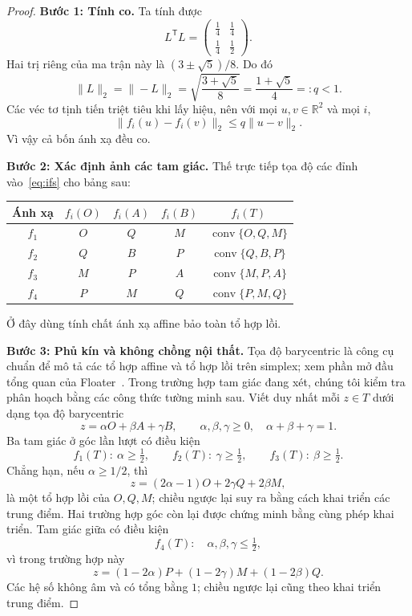 \documentclass[12pt,a4paper]{article}
\begin{document}
\begin{proof}
\textbf{Bước 1: Tính co.}
Ta tính được
\[
L^{\mathsf T}L=\begin{pmatrix}\tfrac14&\tfrac14\\\tfrac14&\tfrac12\end{pmatrix}.
\]
Hai trị riêng của ma trận này là $(3\pm\sqrt5)/8$. Do đó
\[
\|L\|_2=\|-L\|_2
=\sqrt{\frac{3+\sqrt5}{8}}
=\frac{1+\sqrt5}{4}=:q<1.
\]
Các véc tơ tịnh tiến triệt tiêu khi lấy hiệu, nên với mọi $u,v\in\mathbb R^2$ và mọi $i$,
\[
\|f_i(u)-f_i(v)\|_2\leq q\|u-v\|_2.
\]
Vì vậy cả bốn ánh xạ đều co.

\textbf{Bước 2: Xác định ảnh các tam giác.}
Thế trực tiếp tọa độ các đỉnh vào~\eqref{eq:ifs} cho bảng sau:
\begin{center}
\begin{tabular}{ccccc}
\toprule
Ánh xạ & $f_i(O)$ & $f_i(A)$ & $f_i(B)$ & $f_i(T)$\\
\midrule
$f_1$ & $O$ & $Q$ & $M$ & $\operatorname{conv}\{O,Q,M\}$\\
$f_2$ & $Q$ & $B$ & $P$ & $\operatorname{conv}\{Q,B,P\}$\\
$f_3$ & $M$ & $P$ & $A$ & $\operatorname{conv}\{M,P,A\}$\\
$f_4$ & $P$ & $M$ & $Q$ & $\operatorname{conv}\{P,M,Q\}$\\
\bottomrule
\end{tabular}
\end{center}
Ở đây dùng tính chất ánh xạ affine bảo toàn tổ hợp lồi.

\textbf{Bước 3: Phủ kín và không chồng nội thất.}
Tọa độ barycentric là công cụ chuẩn để mô tả các tổ hợp affine và tổ hợp lồi trên simplex; xem phần mở đầu tổng quan của Floater~\cite{floater2015barycentric}. Trong trường hợp tam giác đang xét, chúng tôi kiểm tra phân hoạch bằng các công thức tường minh sau. Viết duy nhất mỗi $z\in T$ dưới dạng tọa độ barycentric
\[
z=\alpha O+\beta A+\gamma B,\qquad
\alpha,\beta,\gamma\geq0,\quad\alpha+\beta+\gamma=1.
\]
Ba tam giác ở góc lần lượt có điều kiện
\[
f_1(T):\ \alpha\geq\tfrac12,\qquad
f_2(T):\ \gamma\geq\tfrac12,\qquad
f_3(T):\ \beta\geq\tfrac12.
\]
Chẳng hạn, nếu $\alpha\geq1/2$, thì
\[
z=(2\alpha-1)O+2\gamma Q+2\beta M,
\]
là một tổ hợp lồi của $O,Q,M$; chiều ngược lại suy ra bằng cách khai triển các trung điểm. Hai trường hợp góc còn lại được chứng minh bằng cùng phép khai triển.
Tam giác giữa có điều kiện
\[
f_4(T):\quad \alpha,\beta,\gamma\leq\tfrac12,
\]
vì trong trường hợp này
\[
z=(1-2\alpha)P+(1-2\gamma)M+(1-2\beta)Q.
\]
Các hệ số không âm và có tổng bằng $1$; chiều ngược lại cũng theo khai triển trung điểm.


\end{proof}
\end{document}
